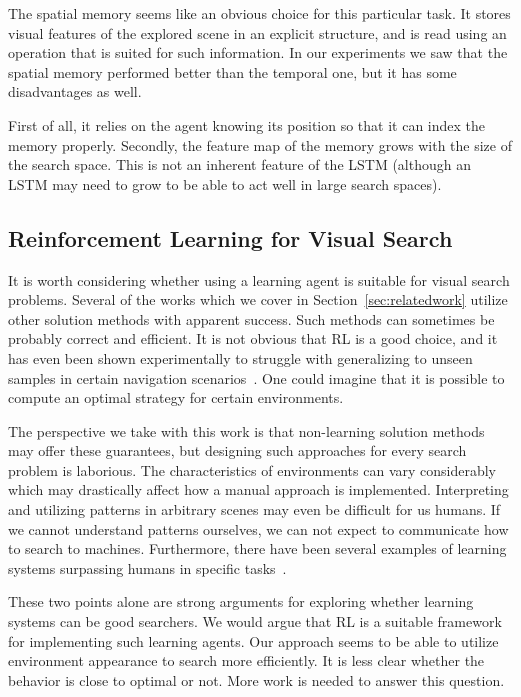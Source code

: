 The spatial memory seems like an obvious choice for this particular task.
It stores visual features of the explored scene in an explicit structure, and is read using an operation that is suited for such information.
In our experiments we saw that the spatial memory performed better than the temporal one,
but it has some disadvantages as well.

First of all, it relies on the agent knowing its position so that it can index the memory properly.
Secondly, the feature map of the memory grows with the size of the search space.
This is not an inherent feature of the LSTM (although an LSTM may need to grow to be able to act well in large search spaces).


\subsection{Reinforcement Learning for Visual Search}

It is worth considering whether using a learning agent is suitable for visual search problems.
Several of the works which we cover in Section~\ref{sec:relatedwork} utilize other solution methods with apparent success.
Such methods can sometimes be probably correct and efficient.
It is not obvious that RL is a good choice, and it has even been shown experimentally to struggle with generalizing to unseen samples in certain navigation scenarios~\cite{dhiman_critical_2019}.
One could imagine that it is possible to compute an optimal strategy for certain environments.

The perspective we take with this work is that non-learning solution methods may offer these guarantees, but designing such approaches for every search problem is laborious.
The characteristics of environments can vary considerably which may drastically affect how a manual approach is implemented.
Interpreting and utilizing patterns in arbitrary scenes may even be difficult for us humans.
If we cannot understand patterns ourselves, we can not expect to communicate how to search to machines.
Furthermore, there have been several examples of learning systems surpassing humans in specific tasks~\cite{silver_mastering_2016,vinyals_grandmaster_2019}.

These two points alone are strong arguments for exploring whether learning systems can be good searchers.
We would argue that RL is a suitable framework for implementing such learning agents.
Our approach seems to be able to utilize environment appearance to search more efficiently.
It is less clear whether the behavior is close to optimal or not.
More work is needed to answer this question.

